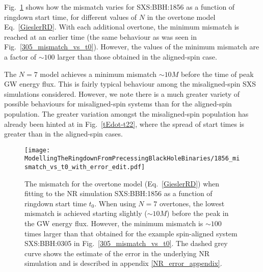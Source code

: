 Fig.~\ref{1856_mismatch_vs_t0} shows how the mismatch varies for SXS:BBH:1856 as a function of ringdown start time, for different values of $N$ in the overtone model Eq.~\ref{GieslerRD}.
With each additional overtone, the minimum mismatch is reached at an earlier time (the same behaviour as was seen in Fig.~\ref{305_mismatch_vs_t0}).
However, the values of the minimum mismatch are a factor of $\sim 100$ larger than those obtained in the aligned-spin case. 

The $N=7$ model achieves a minimum mismatch $\sim 10M$ before the time of peak GW energy flux. This is fairly typical behaviour among the misaligned-spin SXS simulations considered.
However, we note there is a much greater variety of possible behaviours for misaligned-spin systems than for the aligned-spin population. 
The greater variation amongst the misaligned-spin population has already been hinted at in Fig.~\ref{tEdot-t22}, where the spread of start times is greater than in the aligned-spin cases.

\begin{figure}[t]
    \centering
    \texttt{[image: ModellingTheRingdownFromPrecessingBlackHoleBinaries/1856\_mismatch\_vs\_t0\_with\_error\_edit.pdf]}
    \caption[Mismatch as a function of ringdown start time for an overtone model fitted to SXS:BBH:1856]{
    The mismatch for the overtone model (Eq.~\ref{GieslerRD}) when fitting to the NR simulation SXS:BBH:1856 as a function of ringdown start time $t_0$. When using $N=7$ overtones, the lowest mismatch is achieved starting slightly ($\sim 10M$) before the peak in the GW energy flux.
    However, the minimum mismatch is $\sim 100$ times larger than that obtained for the example spin-aligned system SXS:BBH:0305 in Fig.~\ref{305_mismatch_vs_t0}. The dashed grey curve shows the estimate of the error in the underlying NR simulation and is described in appendix \ref{NR_error_appendix}.
    }
    \label{1856_mismatch_vs_t0}
\end{figure}

